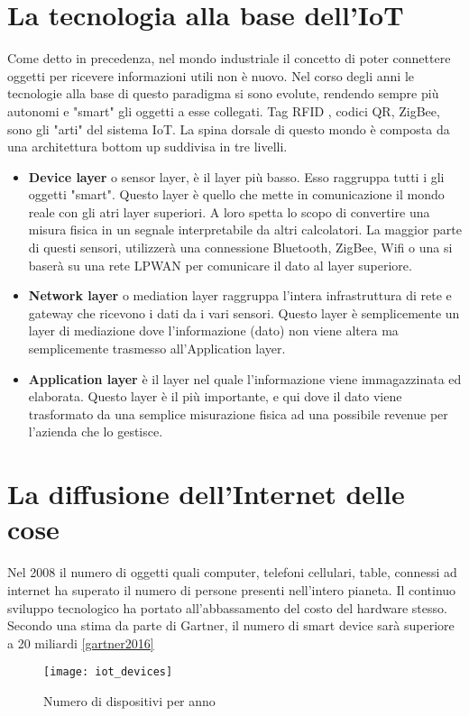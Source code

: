 \section{La tecnologia alla base dell'IoT} 
Come detto in precedenza, nel mondo industriale il concetto di poter connettere
oggetti per ricevere informazioni utili non è nuovo. Nel corso degli anni le
tecnologie alla base di questo paradigma si sono evolute, rendendo sempre più
autonomi e "smart" gli oggetti a esse collegati. Tag RFID , codici QR, ZigBee,
sono gli "arti" del sistema IoT. La spina dorsale di questo mondo è composta da
una architettura bottom up suddivisa in tre livelli.
\begin{itemize}
\item \textbf{Device layer} o sensor layer, è il layer più basso. Esso raggruppa
tutti i gli oggetti "smart". Questo layer è quello che mette in comunicazione il
mondo reale con gli atri layer superiori. A loro spetta lo scopo di convertire
una misura fisica in un segnale interpretabile da altri calcolatori.
La maggior parte di questi sensori, utilizzerà una connessione Bluetooth,
ZigBee, Wifi o una si baserà su una rete LPWAN per comunicare il dato al layer
superiore.
\item \textbf{Network layer} o mediation layer raggruppa l'intera infrastruttura
di rete e gateway che ricevono i dati da i vari sensori. Questo layer è
semplicemente un layer di mediazione dove l'informazione (dato) non viene altera
ma semplicemente trasmesso all'Application layer.
\item \textbf{Application layer} è il layer nel quale l'informazione viene
immagazzinata ed elaborata. Questo layer è il più importante, e qui dove il dato
viene trasformato da una semplice misurazione fisica ad una possibile revenue
per l'azienda che lo gestisce.
\end{itemize}
\section{La diffusione dell'Internet delle cose}
Nel 2008 il numero di oggetti quali computer, telefoni cellulari, table,
connessi ad internet ha superato il numero di persone presenti nell'intero
pianeta. Il continuo sviluppo tecnologico ha portato all'abbassamento del costo
del hardware stesso. Secondo  una stima da parte di Gartner, il numero di smart device sarà
superiore a 20 miliardi \ref{gartner2016}
\begin{figure}[h]
        \centering 
                \texttt{[image: iot\_devices]}
        \caption{Numero di dispositivi per anno}
\end{figure}


